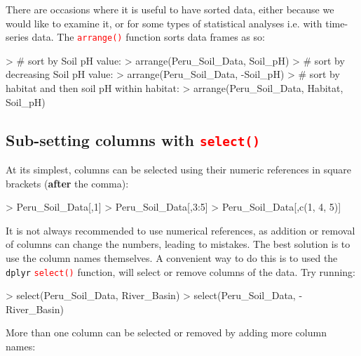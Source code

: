 \documentclass[a4paper,12pt]{article}
\newcommand\code[1]{\textcolor{red}{\texttt{#1}}}
\begin{document}
There are occasions where it is useful to have sorted data, either because we would like to examine it, or for some types of statistical analyses i.e. with time-series data. The \code{arrange()} function sorts data frames as so:

\begin{shaded}
\begin{Schunk}
\begin{Sinput}
>    # sort by Soil pH value:
> arrange(Peru_Soil_Data, Soil_pH) 
>    # sort by decreasing Soil pH value:
> arrange(Peru_Soil_Data, -Soil_pH) 
>    # sort by habitat and then soil pH within habitat:
> arrange(Peru_Soil_Data, Habitat, Soil_pH) 
\end{Sinput}
\end{Schunk}
\end{shaded}


\subsection{Sub-setting columns with \code{select()}}

At its simplest, columns can be selected using their numeric references in square brackets (\textbf{after} the comma):

\begin{shaded}
\begin{Schunk}
\begin{Sinput}
> Peru_Soil_Data[,1]
> Peru_Soil_Data[,3:5]
> Peru_Soil_Data[,c(1, 4, 5)]
\end{Sinput}
\end{Schunk}
\end{shaded}

It is not always recommended to use numerical references, as addition or removal of columns can change the numbers, leading to mistakes. The best solution is to use the column names themselves. A convenient way to do this is to used the \texttt{dplyr} \code{select()} function, will select or remove columns of the data. Try running:

\begin{shaded}
\begin{Schunk}
\begin{Sinput}
> select(Peru_Soil_Data, River_Basin)
> select(Peru_Soil_Data, -River_Basin)
\end{Sinput}
\end{Schunk}
\end{shaded}

More than one column can be selected or removed by adding more column names:
\end{document}
